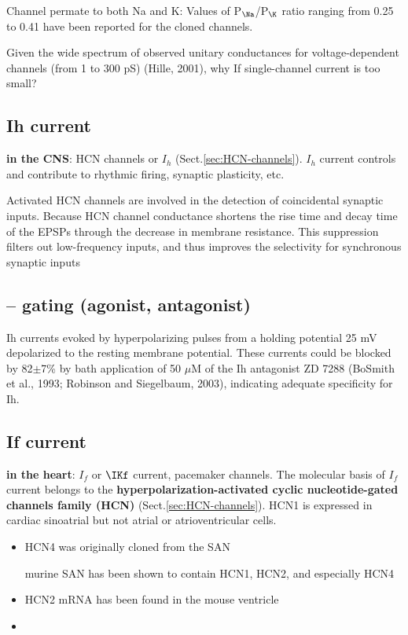 Channel permate to both Na and K: Values of P$_\Na$/P$_\K$ ratio ranging from
0.25 to 0.41 have been reported for the cloned channels.

Given the wide spectrum of observed unitary conductances for voltage-dependent
channels (from 1 to 300 pS) (Hille, 2001), why If single-channel current is too
small?



\subsection{Ih current}
\label{sec:Ih-current}

{\bf in the CNS}: HCN channels or $I_h$ (Sect.\ref{sec:HCN-channels}). $I_h$
current controls and contribute to rhythmic firing, synaptic plasticity, etc.

Activated HCN channels are involved in the detection of coincidental synaptic
inputs. Because HCN channel conductance shortens the rise time and decay time of
the EPSPs through the decrease in membrane resistance.
This suppression filters out low-frequency inputs, and thus improves the
selectivity for synchronous synaptic inputs

\subsection{-- gating (agonist, antagonist)}

Ih currents evoked by hyperpolarizing pulses from a holding potential 25 mV
depolarized to the resting membrane potential. These currents could be blocked
by 82$\pm$7\% by bath application of 50 $\mu$M of the Ih antagonist ZD 7288
(BoSmith et al., 1993; Robinson and Siegelbaum, 2003), indicating adequate
specificity for Ih.

\subsection{If current}
\label{sec:funny-channel}
\label{sec:If-current}

{\bf in the heart}: $I_f$ or $\IKf$ current, pacemaker channels.
The molecular basis of $I_f$ current belongs to the {\bf
hyperpolarization-activated cyclic nucleotide-gated channels family (HCN)}
(Sect.\ref{sec:HCN-channels}).
HCN1 is expressed in cardiac sinoatrial but not atrial or atrioventricular
cells.
\begin{itemize}
  \item HCN4 was originally cloned from the SAN 

murine SAN has been shown to contain HCN1, HCN2, and especially HCN4

  \item HCN2 mRNA has been found in the mouse ventricle
  
  \item 
\end{itemize} 

